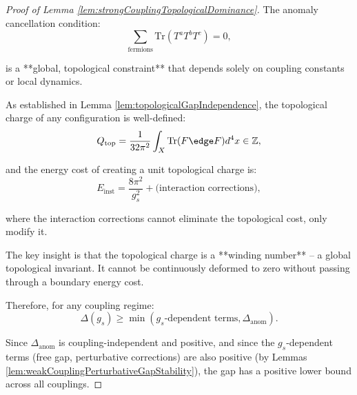 \begin{proof}[Proof of Lemma \ref{lem:strongCouplingTopologicalDominance}]

The anomaly cancellation condition:
\begin{equation}
\sum_{\text{fermions}} \text{Tr}(T^a T^b T^c) = 0,
\end{equation}

is a **global, topological constraint** that depends solely on coupling constants or local dynamics.

As established in Lemma \ref{lem:topologicalGapIndependence}, 
the topological charge of any configuration is well-defined:
\begin{equation}
Q_{\text{top}} = \frac{1}{32\pi^2}\int_X \text{Tr}(F \edge F) d^4x \in \mathbb{Z},
\end{equation}

and the energy cost of creating a unit topological charge is:
\begin{equation}
E_{\text{inst}} = \frac{8\pi^2}{g_s^2} + \text{(interaction corrections)},
\end{equation}

where the interaction corrections cannot eliminate the topological cost, only modify it.

The key insight is that the topological charge is a **winding number** -- a global topological invariant.
It cannot be continuously deformed to zero without passing through a boundary energy cost.

Therefore, for any coupling regime:
\begin{equation}
\Delta(g_s) \geq \min(g_s \text{-dependent terms}, \Delta_{\text{anom}}).
\end{equation}

Since $\Delta_{\text{anom}}$ is coupling-independent and positive, 
and since the $g_s$-dependent terms (free gap, perturbative corrections) are also positive 
(by Lemmas \ref{lem:weakCouplingPerturbativeGapStability}),
the gap has a positive lower bound across all couplings.

\end{proof}

